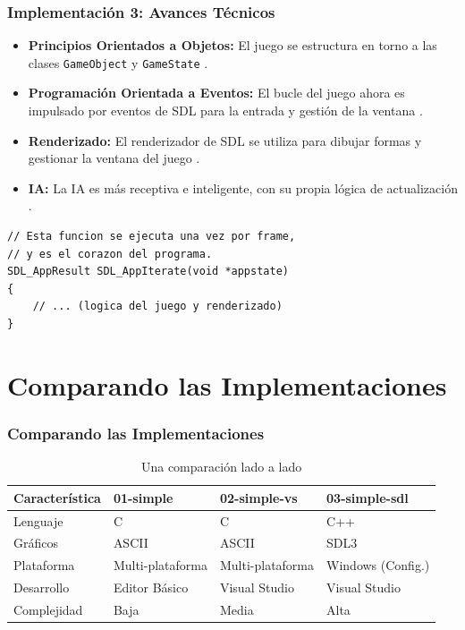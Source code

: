 \documentclass[]{beamer}
\begin{document}
\begin{frame}[fragile]
  \frametitle{Implementación 3: Avances Técnicos}
  \begin{itemize}
    \item \textbf{Principios Orientados a Objetos:} El juego se estructura en torno a las clases \texttt{GameObject} y \texttt{GameState} \cite{pong_sdl_main}.
    \item \textbf{Programación Orientada a Eventos:} El bucle del juego ahora es impulsado por eventos de SDL para la entrada y gestión de la ventana \cite{pong_sdl_main}.
    \item \textbf{Renderizado:} El renderizador de SDL se utiliza para dibujar formas y gestionar la ventana del juego \cite{pong_sdl_main}.
    \item \textbf{IA:} La IA es más receptiva e inteligente, con su propia lógica de actualización \cite{pong_sdl_main}.
  \end{itemize}
  \lstset{style=myC++Style}
  \begin{lstlisting}[]
// Esta funcion se ejecuta una vez por frame,
// y es el corazon del programa.
SDL_AppResult SDL_AppIterate(void *appstate)
{
    // ... (logica del juego y renderizado)
}
  \end{lstlisting}
\end{frame}

\section{Comparando las Implementaciones}
\begin{frame}
  \frametitle{Comparando las Implementaciones}
  \tiny{
  \begin{table}
  \centering
  \begin{tabular}{@{}p{2.2cm}p{1.8cm}p{1.8cm}p{2.2cm}@{}}
  \toprule
  \textbf{Característica} & \textbf{01-simple} & \textbf{02-simple-vs} & \textbf{03-simple-sdl} \\
  \midrule
  Lenguaje & C & C & C++ \\
  Gráficos & ASCII & ASCII & SDL3 \\
  Plataforma & Multi-plataforma & Multi-plataforma & Windows (Config.) \\
  Desarrollo & Editor Básico & Visual Studio & Visual Studio \\
  Complejidad & Baja & Media & Alta \\
  \bottomrule
  \end{tabular}
  \caption{Una comparación lado a lado}
  \end{table}
  }
\end{frame}
\end{document}

